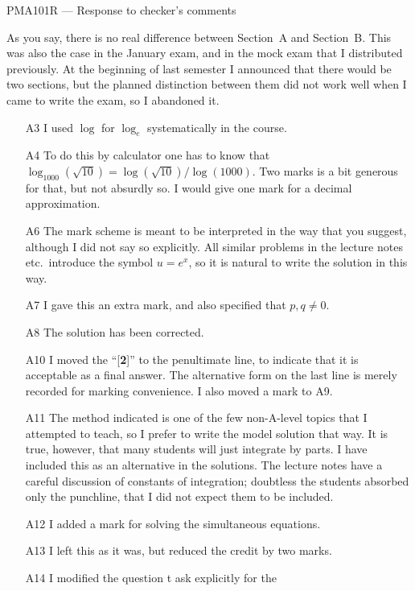 \documentclass{amsart}
\begin{document}
\begin{center}
 {\Large PMA101R --- Response to checker's comments}
\end{center}

As you say, there is no real difference between Section~A and
Section~B.  This was also the case in the January exam, and in the
mock exam that I distributed previously.  At the beginning of last
semester I announced that there would be two sections, but the planned
distinction between them did not work well when I came to write the
exam, so I abandoned it.

\begin{itemize}
 \item[A3] I used $\log$ for $\log_e$ systematically in the course.
 \item[A4] To do this by calculator one has to know that
  $\log_{1000}(\sqrt{10})=\log(\sqrt{10})/\log(1000)$.  Two marks is a
  bit generous for that, but not absurdly so.  I would give one mark
  for a decimal approximation.
 \item[A6] The mark scheme is meant to be interpreted in the way that
  you suggest, although I did not say so explicitly.  All similar
  problems in the lecture notes etc.\ introduce the symbol $u=e^x$, so
  it is natural to write the solution in this way.
 \item[A7] I gave this an extra mark, and also specified that
  $p,q\neq 0$.
 \item[A8] The solution has been corrected.
 \item[A10] I moved the ``[\textbf{2}]'' to the penultimate line, to
  indicate that it is acceptable as a final answer.  The alternative
  form on the last line is merely recorded for marking convenience.  I
  also moved a mark to A9.
 \item[A11] The method indicated is one of the few non-A-level topics
  that I attempted to teach, so I prefer to write the model solution
  that way.  It is true, however, that many students will just
  integrate by parts.  I have included this as an alternative in the
  solutions.  The lecture notes have a careful discussion of constants
  of integration; doubtless the students absorbed only the punchline,
  that I did not expect them to be included.
 \item[A12] I added a mark for solving the simultaneous equations.
 \item[A13] I left this as it was, but reduced the credit by two
  marks. 
 \item[A14] I modified the question t ask explicitly for the

\end{itemize}
\end{document}
